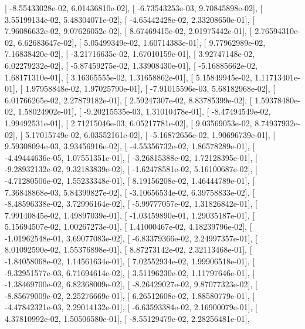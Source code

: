 \documentclass{article}
\begin{document}
       [ -8.55433028e-02,   6.01436810e-02],
       [ -6.73543253e-03,   9.70845898e-02],
       [  3.55199134e-02,   5.48304071e-02],
       [ -4.65442428e-02,   2.33208650e-01],
       [  7.96086632e-02,   9.07626052e-02],
       [  8.67469415e-02,   2.01975442e-01],
       [  2.76594310e-02,   6.62683647e-02],
       [  5.05499349e-02,   1.60714383e-01],
       [  9.77962989e-02,   7.16838420e-02],
       [ -3.21716635e-02,   1.67010159e-01],
       [  3.92747148e-02,   6.02279232e-02],
       [ -5.87459275e-02,   1.33908430e-01],
       [ -5.16885662e-02,   1.68171310e-01],
       [  3.16365555e-02,   1.31658862e-01],
       [  5.15849945e-02,   1.11713401e-01],
       [  1.97958848e-02,   1.97025790e-01],
       [ -7.91015596e-03,   5.68182968e-02],
       [  6.01766265e-02,   2.27879182e-01],
       [  2.59247307e-02,   8.83785399e-02],
       [  1.59378480e-02,   1.58024902e-01],
       [ -9.20215535e-03,   1.31010478e-01],
       [ -8.47494549e-02,   1.99492531e-01],
       [  2.71215046e-03,   6.05217781e-02],
       [  9.03569053e-02,   8.74937932e-02],
       [  5.17015749e-02,   6.03552161e-02],
       [ -5.16872656e-02,   1.90696739e-01],
       [  9.59308094e-03,   3.93456916e-02],
       [ -4.55356732e-02,   1.86578289e-01],
       [ -4.49444636e-05,   1.07551351e-01],
       [ -3.26815388e-02,   1.72128395e-01],
       [ -9.28932132e-02,   9.32183839e-02],
       [ -1.62478581e-02,   5.16100687e-02],
       [ -4.71280506e-02,   1.55233348e-01],
       [  8.19156208e-02,   1.46444789e-01],
       [  7.36848868e-03,   5.84399827e-02],
       [ -3.10656534e-02,   6.39758833e-02],
       [ -8.48596338e-02,   3.72996164e-02],
       [ -5.99777057e-02,   1.31826842e-01],
       [  7.99140845e-02,   1.49897039e-01],
       [ -1.03459890e-01,   1.29035187e-01],
       [  5.15694507e-02,   1.00267273e-01],
       [  1.41000467e-02,   4.18239796e-02],
       [ -1.01962548e-01,   3.69077083e-02],
       [ -6.83379366e-02,   2.24997357e-01],
       [  8.01092590e-02,   1.55376898e-01],
       [  8.87273142e-02,   2.32113468e-01],
       [ -1.84058068e-02,   1.14561634e-01],
       [  7.02552934e-02,   1.99906518e-01],
       [ -9.32951577e-03,   6.71694614e-02],
       [  3.51196230e-02,   1.11797646e-01],
       [ -1.38469700e-02,   6.82368009e-02],
       [ -8.26429027e-02,   9.87077323e-02],
       [ -8.85679009e-02,   2.25276669e-01],
       [  6.26512608e-02,   1.88580779e-01],
       [ -4.47842321e-03,   2.29014132e-01],
       [ -6.63593384e-02,   2.16900079e-01],
       [  4.37810992e-02,   1.50506580e-01],
       [ -8.55129479e-02,   2.28256481e-01],
\end{document}
